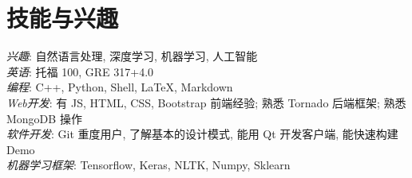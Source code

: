 \section{技能与兴趣}
\textit{兴趣}: 自然语言处理, 深度学习, 机器学习, 人工智能\\
\textit{英语}: 托福 100, GRE 317+4.0\\
\textit{编程}: C++, Python, Shell, LaTeX, Markdown\\
\textit{Web开发}: 有 JS, HTML, CSS, Bootstrap 前端经验; 熟悉 Tornado 后端框架; 熟悉 MongoDB 操作\\
\textit{软件开发}: Git 重度用户, 了解基本的设计模式, 能用 Qt 开发客户端, 能快速构建 Demo\\
\textit{机器学习框架}: Tensorflow, Keras, NLTK, Numpy, Sklearn\\

